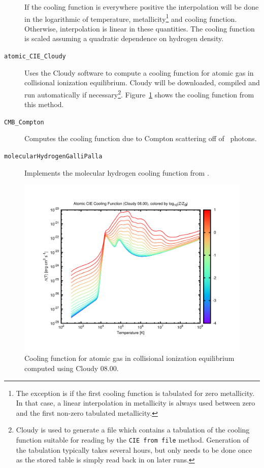 \begin{description}
\begin{description}
 \end{description}
 If the cooling function is everywhere positive the interpolation will be done in the logarithmic of temperature, metallicity\footnote{The exception is if the first cooling function is tabulated for zero metallicity. In that case, a linear interpolation in metallicity is always used between zero and the first non-zero tabulated metallicity.} and cooling function. Otherwise, interpolation is linear in these quantities. The cooling function is scaled assuming a quadratic dependence on hydrogen density.
 \item [{\tt atomic\_CIE\_Cloudy}] Uses the {\sc Cloudy} software to compute a cooling function for atomic gas in collisional ionization equilibrium. {\sc Cloudy} will be downloaded, compiled and run automatically if necessary\footnote{{\sc Cloudy} is used to generate a file which contains a tabulation of the cooling function suitable for reading by the {\tt CIE from file} method. Generation of the tabulation typically takes several hours, but only needs to be done once as the stored table is simply read back in on later runs.}. Figure~\ref{fig:atomicCIECloudyCoolingFunction} shows the cooling function from this method.
 \item [{\tt CMB\_Compton}] Computes the cooling function due to Compton scattering off of \CMB\ photons.
 \item [{\tt molecularHydrogenGalliPalla}] Implements the molecular hydrogen cooling function from \cite{galli_chemistry_1998}.
\end{description}

\begin{figure}
 \begin{center}
 \includegraphics[width=160mm]{../plots/cooling_function_Atomic_CIE_Cloudy.pdf}
 \end{center}
 \caption{Cooling function for atomic gas in collisional ionization equilibrium computed using Cloudy 08.00.}
 \label{fig:atomicCIECloudyCoolingFunction}
\end{figure}

